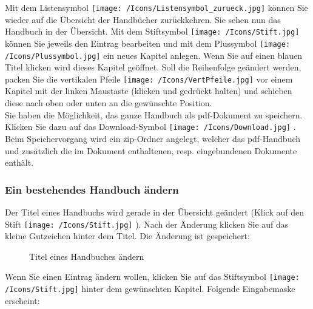Mit dem Listensymbol \texttt{[image: /Icons/Listensymbol\_zurueck.jpg]}  können Sie wieder auf die Übersicht der Handbücher zurückkehren. Sie sehen nun das Handbuch in der Übersicht. Mit dem Stiftsymbol \texttt{[image: /Icons/Stift.jpg]}  können Sie jeweils den Eintrag bearbeiten und mit dem Plussymbol \texttt{[image: /Icons/Plussymbol.jpg]}  ein neues Kapitel anlegen. Wenn Sie auf einen blauen Titel klicken  wird dieses Kapitel geöffnet. Soll die Reihenfolge geändert werden, packen Sie die vertikalen Pfeile \texttt{[image: /Icons/VertPfeile.jpg]}  vor einem Kapitel mit der linken Maustaste (klicken und gedrückt halten) und schieben diese nach oben oder unten an die gewünschte Position. \\
Sie haben die Möglichkeit, das ganze Handbuch als pdf-Dokument zu speichern. Klicken Sie dazu auf das Download-Symbol \texttt{[image: /Icons/Download.jpg]} . Beim Speichervorgang wird ein zip-Ordner angelegt, welcher das pdf-Handbuch und zusätzlich die im Dokument enthaltenen, resp. eingebundenen Dokumente enthält.

\subsubsection{Ein bestehendes Handbuch ändern}

Der Titel eines Handbuchs wird gerade in der Übersicht geändert (Klick auf den Stift \texttt{[image: /Icons/Stift.jpg]} ). Nach der Änderung klicken Sie auf das kleine Gutzeichen hinter dem Titel. Die Änderung ist gespeichert:

\begin{figure}[H]
\caption{Titel eines Handbuches ändern}
\end{figure}

Wenn Sie einen Eintrag ändern wollen, klicken Sie auf das Stiftsymbol \texttt{[image: /Icons/Stift.jpg]} hinter dem gewünschten Kapitel. Folgende Eingabemaske erscheint:

